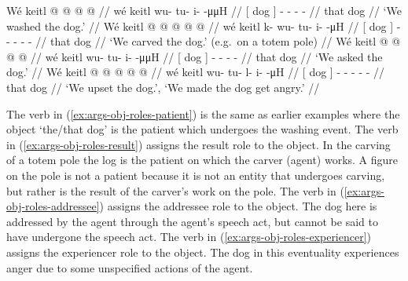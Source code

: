 \pex\label{exx:args-obj-roles}%
\a\label{ex:args-obj-roles-patient}%
%
\begingl
	\gla	{} Wé keitl {}  @ {} @ {} @ {} @ {} //
	\glb	{} wé keitl {} wu- tu- i-  -μμH //
	\glc	{}[  dog {}] - - -  - //
	\gld	{} that dog {}  {} {} {} {} //
	\glft	‘We washed the dog.’
		//
\endgl
\a\label{ex:args-obj-roles-result}%
%
\begingl
	\gla	{} Wé keitl {}  @ {} @ {} @ {} @ {} @ {} //
	\glb	{} wé keitl {} k- wu- tu- i-  -μH //
	\glc	{}[  dog {}] - - - -  - //
	\gld	{} that dog {}  {} {} {} {} {} //
	\glft	‘We carved the dog.’ (e.g.\ on a totem pole)
		//
\endgl
\a\label{ex:args-obj-roles-addressee}%
%
\begingl
	\gla	{} Wé keitl {}  @ {} @ {} @ {} @ {} //
	\glb	{} wé keitl {} wu- tu- i-  -μμH //
	\glc	{}[  dog {}] - - -  - //
	\gld	{} that dog {}  {} {} {} {} //
	\glft	‘We asked the dog.’
		//
\endgl
\a\label{ex:args-obj-roles-experiencer}%
%
\begingl
	\gla	{} Wé keitl {}  @ {} @ {} @ {} @ {} @ {} //
	\glb	{} wé keitl {} wu- tu- l- i-  -μH //
	\glc	{}[  dog {}] - - - -  - //
	\gld	{} that dog {}  {} {} {} {} {} //
	\glft	‘We upset the dog.’, ‘We made the dog get angry.’
		//
\endgl
\xe

The verb in (\ref{ex:args-obj-roles-patient}) is the same as earlier examples where the object  ‘the/that dog’ is the patient which undergoes the washing event.
The verb in (\ref{ex:args-obj-roles-result}) assigns the result role to the object. In the carving of a totem pole the log is the patient on which the carver (agent) works.
A figure on the pole is not a patient because it is not an entity that undergoes carving, but rather is the result of the carver’s work on the pole.
The verb in (\ref{ex:args-obj-roles-addressee}) assigns the addressee role to the object.
The dog here is addressed by the agent through the agent’s speech act, but cannot be said to have undergone the speech act.
The verb in (\ref{ex:args-obj-roles-experiencer}) assigns the experiencer role to the object.
The dog in this eventuality experiences anger due to some unspecified actions of the agent.

